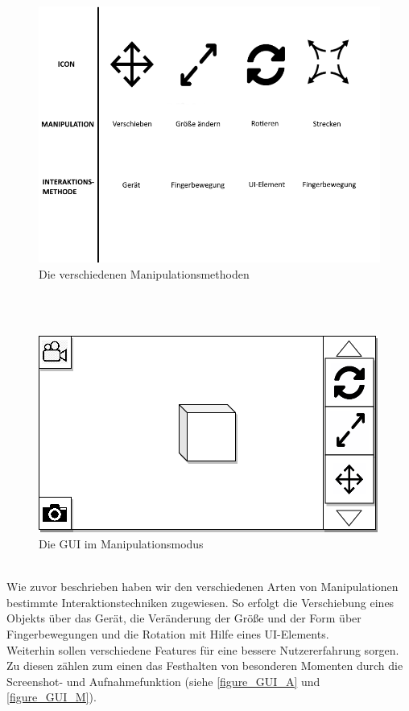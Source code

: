 \documentclass[12pt,a4paper, oneside]{scrartcl}
\begin{document}
\begin{figure}[ht!]
\centering
\includegraphics[scale=0.375]{Manipulationsmethoden}
\caption{Die verschiedenen Manipulationsmethoden}
\label{figure_M}
\end{figure}
%
\\
%
\\
\begin{figure}[ht!]
\centering
\includegraphics[scale=0.4]{GUIManipulationsmodus}
\caption{Die GUI im Manipulationsmodus}
\label{figure_GUI_M}
\end{figure}
\\
Wie zuvor beschrieben haben wir den verschiedenen Arten von Manipulationen bestimmte Interaktionstechniken zugewiesen. So erfolgt die Verschiebung eines Objekts über das Gerät, die Veränderung der Größe und der Form über Fingerbewegungen und die Rotation mit Hilfe eines UI-Elements. \\
Weiterhin sollen verschiedene Features für eine bessere Nutzererfahrung sorgen. Zu diesen zählen zum einen das Festhalten von besonderen Momenten durch die Screenshot- und Aufnahmefunktion (siehe \autoref{figure_GUI_A} und \autoref{figure_GUI_M}). 
\end{document}
